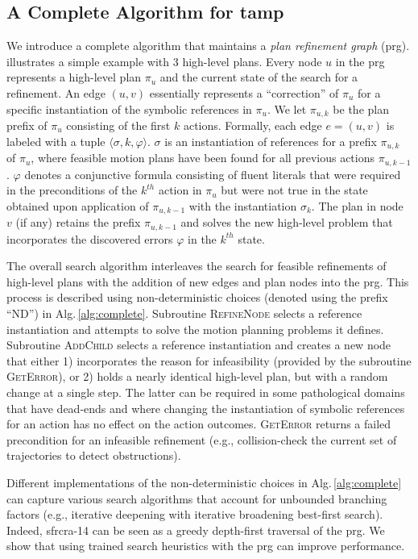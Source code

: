 \subsection{A Complete Algorithm for {\sc tamp}}
We introduce a complete algorithm that maintains a \emph{plan
  refinement graph} ({\sc prg}).  illustrates a simple
example with 3 high-level plans.  Every node $u$ in the {\sc prg} represents
a high-level plan $\pi_u$ and the current state of the search for a
refinement. An edge $(u,v)$ essentially represents a ``correction'' of
$\pi_u$ for a specific instantiation of the symbolic references in
$\pi_u$. We let $\pi_{u,k}$ be the plan prefix of $\pi_u$ consisting
of the first $k$ actions. Formally, each edge $e=(u,v)$ is labeled
with a tuple $\langle \sigma, k, \varphi \rangle$.  $\sigma$ is an
instantiation of references for a prefix $\pi_{u,k}$ of $\pi_u$, where
feasible motion plans have been found for all previous actions
$\pi_{u,k-1}$. $\varphi$ denotes a conjunctive formula consisting of
fluent literals that were required in the preconditions of the
$k^{th}$ action in $\pi_u$ but were not true in the state obtained
upon application of $\pi_{u,k-1}$ with the instantiation $\sigma_k$.
The plan in node $v$ (if any) retains the prefix $\pi_{u,k-1}$ and
solves the new high-level problem that incorporates the discovered
errors $\varphi$ in the $k^{th}$ state.

The overall search algorithm interleaves the search for feasible
refinements of high-level plans with the addition of new edges and plan
nodes into the {\sc prg}. This process is described using
non-deterministic choices (denoted using the prefix ``ND'') in
Alg.\,\ref{alg:complete}. Subroutine \textsc{RefineNode} selects a
reference instantiation and attempts to solve the motion planning
problems it defines. Subroutine \textsc{AddChild} selects a reference
instantiation and creates a new node that either 1) incorporates the
reason for infeasibility (provided by the subroutine
\textsc{GetError}), or 2) holds a nearly identical high-level plan,
but with a random change at a single step.  The latter can be required
in some pathological domains that have dead-ends and where changing
the instantiation of symbolic references for an action has no effect
on the action outcomes. \textsc{GetError} returns a failed
precondition for an infeasible refinement (e.g., collision-check
the current set of trajectories to detect obstructions).

Different implementations of the non-deterministic choices in
Alg.\,\ref{alg:complete} can capture various search algorithms that
account for unbounded branching factors (e.g., iterative deepening
with iterative broadening best-first search). Indeed, {\sc sfrcra-14}
can be seen as a greedy depth-first traversal of the {\sc prg}. We
show that using trained search heuristics with the {\sc prg} can
improve performance.

